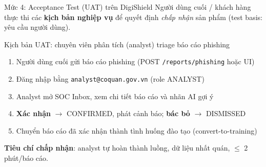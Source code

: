 \documentclass[aspectratio=169,12pt]{beamer}
\begin{document}
\begin{frame}{Mức 4: Acceptance Test (UAT) trên DigiShield}
  \vspace*{-0.2em}
  \small Người dùng cuối / khách hàng thực thi các \textbf{kịch bản nghiệp vụ}
  để quyết định \textit{chấp nhận} sản phẩm (test basis: yêu cầu người dùng).

  \vspace{0.2em}
  \begin{exampleblock}{Kịch bản UAT: chuyên viên phân tích (analyst) triage báo cáo phishing}
    \small
    \begin{enumerate}
      \item Người dùng cuối gửi báo cáo phishing (POST \texttt{/reports/phishing} hoặc UI)
      \item Đăng nhập bằng \texttt{analyst@coquan.gov.vn} (role ANALYST)
      \item Analyst mở SOC Inbox, xem chi tiết báo cáo và nhãn AI gợi ý
      \item \textbf{Xác nhận} $\to$ CONFIRMED, phát cảnh báo; \textbf{bác bỏ} $\to$ DISMISSED
      \item Chuyển báo cáo đã xác nhận thành tình huống đào tạo (convert-to-training)
    \end{enumerate}
    \textbf{Tiêu chí chấp nhận}: analyst tự hoàn thành luồng, dữ liệu nhất quán,
    $\le$ 2 phút/báo cáo.
  \end{exampleblock}
\end{frame}
\end{document}
